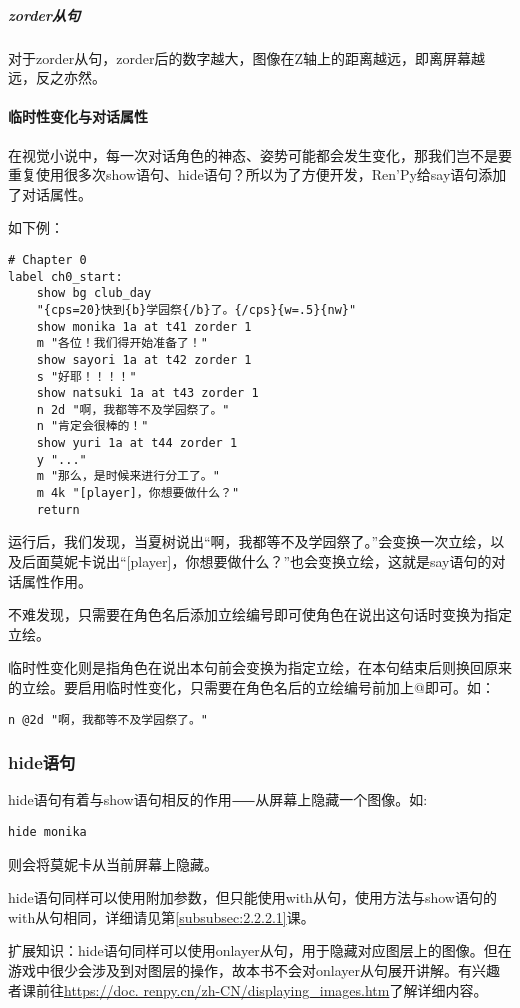\subparagraph{zorder从句}
对于zorder从句，zorder后的数字越大，图像在Z轴上的距离越远，即离屏幕越远，反之亦然。

\paragraph{临时性变化与对话属性}
在视觉小说中，每一次对话角色的神态、姿势可能都会发生变化，那我们岂不是要重复使用很多次show语句、hide语句？所以为了方便开发，Ren'Py给say语句添加了对话属性。

如下例：
\begin{lstlisting}
# Chapter 0
label ch0_start:
    show bg club_day
    "{cps=20}快到{b}学园祭{/b}了。{/cps}{w=.5}{nw}"
    show monika 1a at t41 zorder 1
    m "各位！我们得开始准备了！"
    show sayori 1a at t42 zorder 1
    s "好耶！！！！"
    show natsuki 1a at t43 zorder 1
    n 2d "啊，我都等不及学园祭了。"
    n "肯定会很棒的！"
    show yuri 1a at t44 zorder 1
    y "..."
    m "那么，是时候来进行分工了。"
    m 4k "[player]，你想要做什么？"
    return
\end{lstlisting}

运行后，我们发现，当夏树说出“啊，我都等不及学园祭了。”会变换一次立绘，以及后面莫妮卡说出“[player]，你想要做什么？”也会变换立绘，这就是say语句的对话属性作用。

不难发现，只需要在角色名后添加立绘编号即可使角色在说出这句话时变换为指定立绘。

临时性变化则是指角色在说出本句前会变换为指定立绘，在本句结束后则换回原来的立绘。要启用临时性变化，只需要在角色名后的立绘编号前加上@即可。如：
\begin{lstlisting}[numbers=none]
    n @2d "啊，我都等不及学园祭了。"
\end{lstlisting}

\subsubsection{hide语句}

hide语句有着与show语句相反的作用⸺从屏幕上隐藏一个图像。如:

\begin{lstlisting}[numbers=none]
hide monika
\end{lstlisting}

则会将莫妮卡从当前屏幕上隐藏。

hide语句同样可以使用附加参数，但只能使用with从句，使用方法与show语句的with从句相同，详细请见第\ref{subsubsec:2.2.2.1}课。

\begin{ExtraKnowledge}
    扩展知识：hide语句同样可以使用onlayer从句，用于隐藏对应图层上的图像。但在游戏中很少会涉及到对图层的操作，故本书不会对onlayer从句展开讲解。有兴趣者课前往\url{https://doc.
    renpy.cn/zh-CN/displaying_images.htm}了解详细内容。
\end{ExtraKnowledge}

